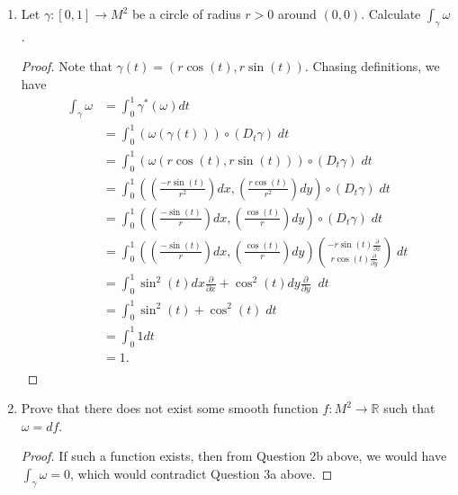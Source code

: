 \documentclass{article}
\begin{document}
\begin{enumerate}[label={\bf Q\arabic*:}]
    \begin{enumerate}
      \item Let $\gamma:[0,1]\rightarrow M^2$ be a circle of radius $r>0$
        around $(0,0)$. Calculate $\int_\gamma\omega$.
        \begin{proof}
          Note that $\gamma(t)=(r\cos(t),r\sin(t))$. Chasing definitions,
          we have
          \begin{align*}
            \int_\gamma\omega &=\int_0^1\gamma^*(\omega)dt \\
              &=\int_0^1(\omega(\gamma(t))) \circ(D_t\gamma)\; dt \\
              &=\int_0^1(\omega(r\cos(t),r\sin(t))) \circ(D_t\gamma)\; dt \\
              &=\int_0^1 \left(\left(\frac{-r\sin(t)}{r^2}\right)dx,
                \left(\frac{r\cos(t)}{r^2}\right)dy\right) \circ(D_t\gamma)\;
                dt \\
              &=\int_0^1 \left(\left(\frac{-\sin(t)}{r}\right)dx,
                \left(\frac{\cos(t)}{r}\right)dy\right) \circ(D_t\gamma)\;
                dt \\
              &=\int_0^1 \left(\left(\frac{-\sin(t)}{r}\right)dx,
                \left(\frac{\cos(t)}{r}\right)dy\right)
                \binom{-r\sin(t)\frac{\partial}{\partial x}}
                {r\cos(t)\frac{\partial}{\partial y}}\; dt \\
              &=\int_0^1 \sin^2(t)dx\frac{\partial}{\partial x} +
                \cos^2(t)dy\frac{\partial}{\partial y}\;\; dt \\
              &=\int_0^1 \sin^2(t)+\cos^2(t)\; dt \\
              &=\int_0^1 1 dt \\
              &=1. \\
          \end{align*}
        \end{proof}

      \item Prove that there does not exist some smooth function
        $f:M^2\rightarrow\mathbb{R}$ such that $\omega=df$.
        \begin{proof}
          If such a function exists, then from Question 2b above, we would
          have $\int_\gamma\omega=0$, which would contradict Question 3a
          above.
        \end{proof}


\end{enumerate}
\end{enumerate}
\end{document}
